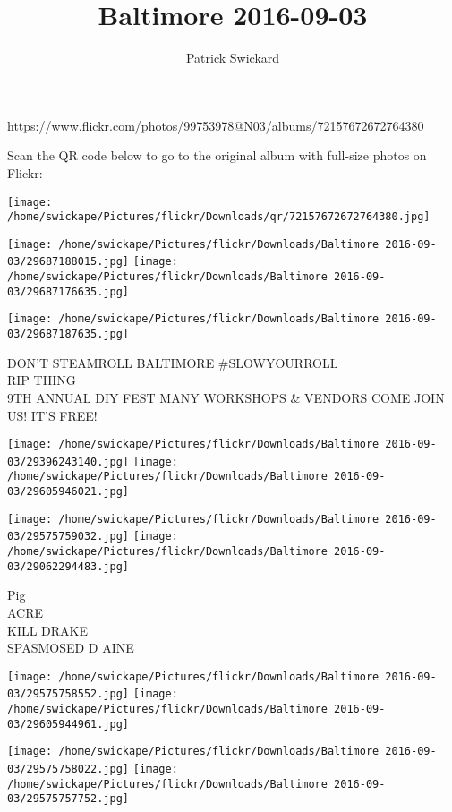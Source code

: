 \documentclass[10pt,letterpaper]{article}
\title{Baltimore 2016-09-03}
\author{Patrick Swickard}
\date{}
\begin{document}
\maketitle

\url{https://www.flickr.com/photos/99753978@N03/albums/72157672672764380}

Scan the QR code below to go to the original album with full-size photos on Flickr:

\texttt{[image: /home/swickape/Pictures/flickr/Downloads/qr/72157672672764380.jpg]}
\pagebreak

\texttt{[image: /home/swickape/Pictures/flickr/Downloads/Baltimore 2016-09-03/29687188015.jpg]}
\texttt{[image: /home/swickape/Pictures/flickr/Downloads/Baltimore 2016-09-03/29687176635.jpg]}

\vspace{0.25in}
\texttt{[image: /home/swickape/Pictures/flickr/Downloads/Baltimore 2016-09-03/29687187635.jpg]}

DON'T STEAMROLL BALTIMORE \#SLOWYOURROLL\\
RIP THING\\
9TH ANNUAL DIY FEST MANY WORKSHOPS \& VENDORS COME JOIN US!  IT'S FREE!
\pagebreak

\texttt{[image: /home/swickape/Pictures/flickr/Downloads/Baltimore 2016-09-03/29396243140.jpg]}
\texttt{[image: /home/swickape/Pictures/flickr/Downloads/Baltimore 2016-09-03/29605946021.jpg]}

\texttt{[image: /home/swickape/Pictures/flickr/Downloads/Baltimore 2016-09-03/29575759032.jpg]}
\texttt{[image: /home/swickape/Pictures/flickr/Downloads/Baltimore 2016-09-03/29062294483.jpg]}

Pig\\
ACRE\\
KILL DRAKE\\
SPASMOSED D AINE
\pagebreak

\texttt{[image: /home/swickape/Pictures/flickr/Downloads/Baltimore 2016-09-03/29575758552.jpg]}
\texttt{[image: /home/swickape/Pictures/flickr/Downloads/Baltimore 2016-09-03/29605944961.jpg]}

\texttt{[image: /home/swickape/Pictures/flickr/Downloads/Baltimore 2016-09-03/29575758022.jpg]}
\texttt{[image: /home/swickape/Pictures/flickr/Downloads/Baltimore 2016-09-03/29575757752.jpg]}
\end{document}
